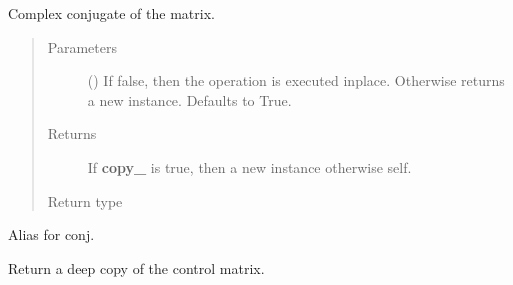 \documentclass[letterpaper,10pt,english]{sphinxmanual}
\begin{document}
\begin{fulllineitems}
\begin{fulllineitems}
\label{\detokenize{qsim:qsim.matrix.OperatorMatrix.conj}}
Complex conjugate of the matrix.
\begin{quote}\begin{description}
\item[{Parameters}] \leavevmode
{} (\sphinxstyleliteralemphasis{\sphinxupquote{, }}) \textendash{} If false, then the operation is executed inplace. Otherwise returns
a new instance. Defaults to True.

\item[{Returns}] \leavevmode
{} \textendash{} If {\color{red}\bfseries{}copy\_} is true, then a new instance otherwise self.

\item[{Return type}] \leavevmode
{\hyperref[\detokenize{qsim:qsim.matrix.OperatorMatrix}]{}}

\end{description}\end{quote}

\end{fulllineitems}


\begin{fulllineitems}
\label{\detokenize{qsim:qsim.matrix.OperatorMatrix.conjugate}}
Alias for conj.

\end{fulllineitems}


\begin{fulllineitems}
\label{\detokenize{qsim:qsim.matrix.OperatorMatrix.copy}}
Return a deep copy of the control matrix.


\end{fulllineitems}
\end{fulllineitems}
\end{document}
